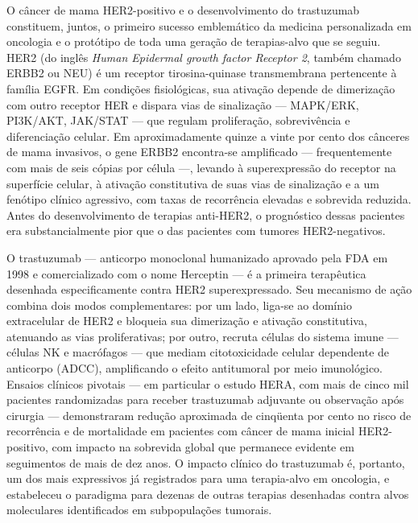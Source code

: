 O câncer de mama HER2-positivo e o desenvolvimento do trastuzumab constituem, juntos, o primeiro sucesso emblemático da medicina personalizada em oncologia e o protótipo de toda uma geração de terapias-alvo que se seguiu. HER2 (do inglês \emph{Human Epidermal growth factor Receptor 2}, também chamado ERBB2 ou NEU) é um receptor tirosina-quinase transmembrana pertencente à família EGFR. Em condições fisiológicas, sua ativação depende de dimerização com outro receptor HER e dispara vias de sinalização --- MAPK/ERK, PI3K/AKT, JAK/STAT --- que regulam proliferação, sobrevivência e diferenciação celular. Em aproximadamente quinze a vinte por cento dos cânceres de mama invasivos, o gene ERBB2 encontra-se amplificado --- frequentemente com mais de seis cópias por célula ---, levando à superexpressão do receptor na superfície celular, à ativação constitutiva de suas vias de sinalização e a um fenótipo clínico agressivo, com taxas de recorrência elevadas e sobrevida reduzida. Antes do desenvolvimento de terapias anti-HER2, o prognóstico dessas pacientes era substancialmente pior que o das pacientes com tumores HER2-negativos.

O trastuzumab --- anticorpo monoclonal humanizado aprovado pela FDA em 1998 e comercializado com o nome Herceptin --- é a primeira terapêutica desenhada especificamente contra HER2 superexpressado. Seu mecanismo de ação combina dois modos complementares: por um lado, liga-se ao domínio extracelular de HER2 e bloqueia sua dimerização e ativação constitutiva, atenuando as vias proliferativas; por outro, recruta células do sistema imune --- células NK e macrófagos --- que mediam citotoxicidade celular dependente de anticorpo (ADCC), amplificando o efeito antitumoral por meio imunológico. Ensaios clínicos pivotais --- em particular o estudo HERA, com mais de cinco mil pacientes randomizadas para receber trastuzumab adjuvante ou observação após cirurgia --- demonstraram redução aproximada de cinqüenta por cento no risco de recorrência e de mortalidade em pacientes com câncer de mama inicial HER2-positivo, com impacto na sobrevida global que permanece evidente em seguimentos de mais de dez anos. O impacto clínico do trastuzumab é, portanto, um dos mais expressivos já registrados para uma terapia-alvo em oncologia, e estabeleceu o paradigma para dezenas de outras terapias desenhadas contra alvos moleculares identificados em subpopulações tumorais.

